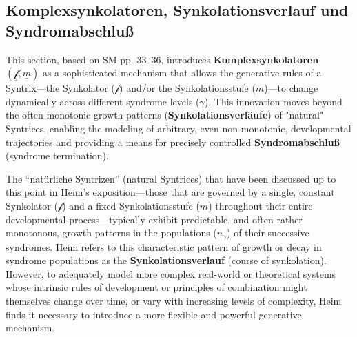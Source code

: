 \documentclass[12pt]{article}
\newcommand{\q}[1]{\enquote{#1}}
\newcommand{\synkolator}{\mathcal{f}}
\newcommand{\synkolationsstufe}{m}
\begin{document}
\subsection{Komplexsynkolatoren, Synkolationsverlauf und Syndromabschluß}
\label{sec:komplexsynkolatoren}

This section, based on SM pp. 33--36, introduces \textbf{Komplexsynkolatoren} \( (\underline{\synkolator}, \underline{\synkolationsstufe}) \) as a sophisticated mechanism that allows the generative rules of a Syntrix—the Synkolator (\(\synkolator\)) and/or the Synkolationsstufe (\(\synkolationsstufe\))—to change dynamically across different syndrome levels (\(\gamma\)). This innovation moves beyond the often monotonic growth patterns (\textbf{Synkolationsverläufe}) of "natural" Syntrices, enabling the modeling of arbitrary, even non-monotonic, developmental trajectories and providing a means for precisely controlled \textbf{Syndromabschluß} (syndrome termination).

The \q{natürliche Syntrizen} (natural Syntrices) that have been discussed up to this point in Heim's exposition—those that are governed by a single, constant Synkolator (\( \synkolator \)) and a fixed Synkolationsstufe (\( \synkolationsstufe \)) throughout their entire developmental process—typically exhibit predictable, and often rather monotonous, growth patterns in the populations (\( n_\gamma \)) of their successive syndromes. Heim refers to this characteristic pattern of growth or decay in syndrome populations as the \textbf{Synkolationsverlauf} (course of synkolation). However, to adequately model more complex real-world or theoretical systems whose intrinsic rules of development or principles of combination might themselves change over time, or vary with increasing levels of complexity, Heim finds it necessary to introduce a more flexible and powerful generative mechanism.
\end{document}
